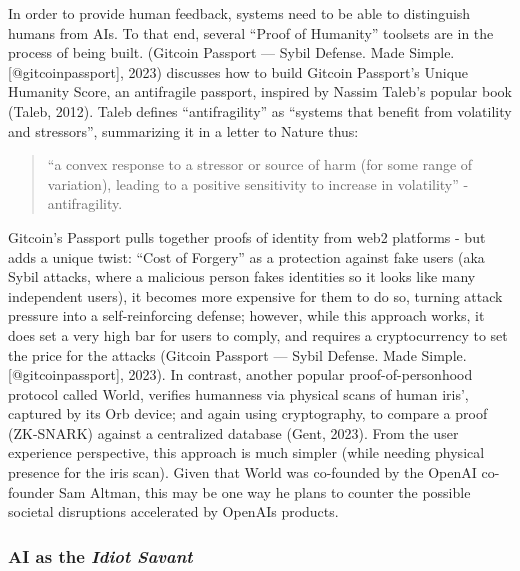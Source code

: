 \documentclass[
  letterpaper,
  DIV=11,
  numbers=noendperiod]{scrartcl}
\begin{document}
In order to provide human feedback, systems need to be able to
distinguish humans from AIs. To that end, several ``Proof of Humanity''
toolsets are in the process of being built. (Gitcoin Passport --- Sybil
Defense. Made Simple. {[}@gitcoinpassport{]}, 2023) discusses how to
build Gitcoin Passport's Unique Humanity Score, an antifragile passport,
inspired by Nassim Taleb's popular book (Taleb, 2012). Taleb defines
``antifragility'' as ``systems that benefit from volatility and
stressors'', summarizing it in a letter to Nature thus:

\begin{quote}
``a convex response to a stressor or source of harm (for some range of
variation), leading to a positive sensitivity to increase in
volatility'' - antifragility.
\end{quote}

Gitcoin's Passport pulls together proofs of identity from web2 platforms
- but adds a unique twist: ``Cost of Forgery'' as a protection against
fake users (aka Sybil attacks, where a malicious person fakes identities
so it looks like many independent users), it becomes more expensive for
them to do so, turning attack pressure into a self-reinforcing defense;
however, while this approach works, it does set a very high bar for
users to comply, and requires a cryptocurrency to set the price for the
attacks (Gitcoin Passport --- Sybil Defense. Made Simple.
{[}@gitcoinpassport{]}, 2023). In contrast, another popular
proof-of-personhood protocol called World, verifies humanness via
physical scans of human iris', captured by its Orb device; and again
using cryptography, to compare a proof (ZK-SNARK) against a centralized
database (Gent, 2023). From the user experience perspective, this
approach is much simpler (while needing physical presence for the iris
scan). Given that World was co-founded by the OpenAI co-founder Sam
Altman, this may be one way he plans to counter the possible societal
disruptions accelerated by OpenAIs products.

\subsubsection{\texorpdfstring{AI as the \emph{Idiot
Savant}}{AI as the Idiot Savant}}\label{ai-as-the-idiot-savant}
\end{document}

